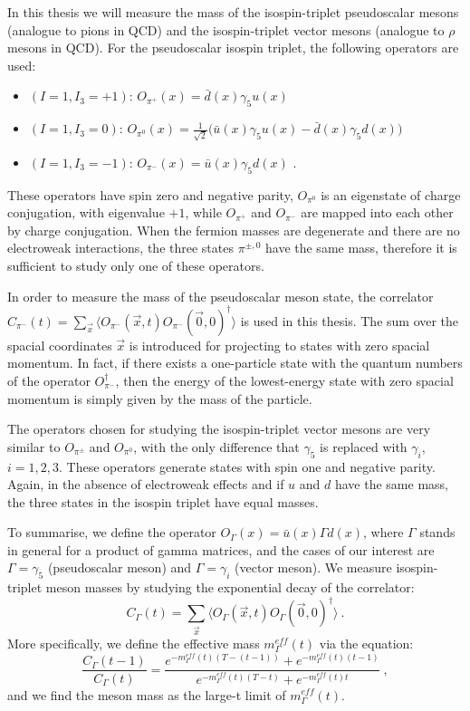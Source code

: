 In this thesis we will measure the mass of the isospin-triplet pseudoscalar mesons (analogue to pions in QCD) and the isospin-triplet vector mesons (analogue to $\rho$ mesons in QCD). For the pseudoscalar isospin triplet, the following operators are used:
\begin{itemize}
\item $(I=1, I_3 = +1)$: $O_{\pi^+}(x) = \bar{d}(x) \gamma_5 u(x)$
\item $(I=1, I_3 = 0)$: $O_{\pi^0}(x) = \frac{1}{\sqrt 2} \bigl( \bar{u}(x) \gamma_5 u(x) - \bar{d}(x) \gamma_5 d(x) \bigr)$
\item $(I=1, I_3 = -1)$: $O_{\pi^-}(x) = \bar{u}(x) \gamma_5 d(x)$ \: .
\end{itemize}
%
These operators have spin zero and negative parity, $O_{\pi^0}$ is an eigenstate of charge conjugation, with eigenvalue $+1$, while $O_{\pi^+}$ and $O_{\pi^-}$ are mapped into each other by charge conjugation. When the fermion masses are degenerate and there are no electroweak interactions, the three states $\pi^{\pm,0}$ have the same mass, therefore it is sufficient to study only one of these operators.

In order to measure the mass of the pseudoscalar meson state, the correlator $C_{\pi^-}(t) = \sum_{\vec x} \langle O_{\pi^-}(\vec x,t)  O_{\pi^-} (\vec 0,0)^{\dagger} \rangle$ is used in this thesis. The sum over the spacial coordinates $\vec x$ is introduced for projecting to states with zero spacial momentum. In fact, if there exists a one-particle state with the quantum numbers of the operator $O^{\dagger}_{\pi^-}$, then the energy of the lowest-energy state with zero spacial momentum is simply given by the mass of the particle.

The operators chosen for studying the isospin-triplet vector mesons are very similar to $O_{\pi^{\pm}}$ and $O_{\pi^0}$, with the only difference that $\gamma_5$ is replaced with $\gamma_i$, $i = 1, 2, 3$. These operators generate states with spin one and negative parity. Again, in the absence of electroweak effects and if $u$ and $d$ have the same mass, the three states in the isospin triplet have equal masses.

To summarise, we define the operator $O_{\Gamma}(x) = \bar u(x) \Gamma d(x) $, where $\Gamma$ stands in general for a product of gamma matrices, and the cases of our interest are $\Gamma =\gamma_5$ (pseudoscalar meson) and $\Gamma = \gamma_i$ (vector meson). We measure isospin-triplet meson masses by studying the exponential decay of the correlator:
\begin{equation}
C_{\Gamma}(t) = \sum_{\vec x} \langle O_{\Gamma}(\vec x,t) O_{\Gamma} (\vec 0, 0)^{\dagger} \rangle \: .
\label{meson_correlator}
\end{equation}
%
More specifically, we define the effective mass $m^{eff}_{\Gamma}(t)$ via the equation:
\begin{equation}
\frac{C_{\Gamma}(t-1)}{C_{\Gamma}(t)} = \frac{e^{-m^{eff}_{\Gamma}(t)(T-(t-1))} + e^{-m^{eff}_{\Gamma}(t)(t-1)}}{e^{-m^{eff}_{\Gamma}(t)(T-t)} + e^{-m^{eff}_{\Gamma}(t)t}} \: ,
\label{eff_mass_mesons}
\end{equation}
%
and we find the meson mass as the large-t limit of $m^{eff}_{\Gamma}(t)$. 

